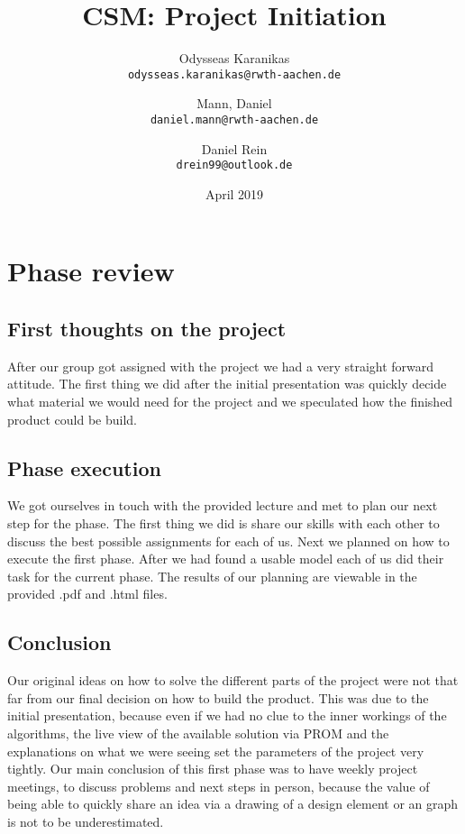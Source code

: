 \documentclass[12pt]{extarticle}
\title{CSM: Project Initiation}
\author{
Odysseas Karanikas\\
\texttt{odysseas.karanikas@rwth-aachen.de}
\and
Mann, Daniel\\
\texttt{daniel.mann@rwth-aachen.de}
\and
Daniel Rein\\
\texttt{drein99@outlook.de}
}
\date{April 2019}
\begin{document}
\maketitle

\section{Phase review}
\subsection{First thoughts on the project}
After our group got assigned with the project we had a very straight forward attitude. The first thing we did after the initial presentation was quickly decide what material we would need for the project and we speculated how the finished product could be build.
\subsection{Phase execution}
 We got ourselves in touch with the provided lecture and met to plan our next step for the phase. The first thing we did is share our skills with each other to discuss the best possible assignments for each of us. Next we planned on how to execute the first phase. After we had found a usable model each of us did their task for the current phase. The results of our planning are viewable in the provided .pdf and .html files.
\subsection{Conclusion}
Our original ideas on how to solve the different parts of the project were not that far from our final decision on how to build the product. This was due to the initial presentation, because even if we had no clue to the inner workings of the algorithms, the live view of the available solution via PROM and the explanations on what we were seeing set the parameters of the project very tightly. 
Our main conclusion of this first phase was to have weekly project meetings, to discuss problems and next steps in person, because the value of being able to quickly share an idea via a drawing of a design element or an graph is not to be underestimated.

\printbibliography
\end{document}

